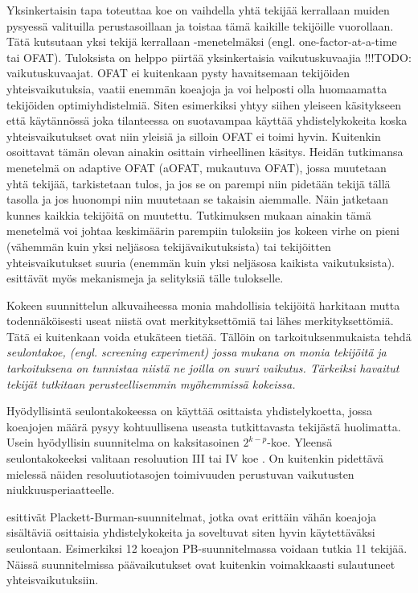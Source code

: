 \documentclass[12pt,a4paper,finnish]{tutthesis}
\newcommand\todo[1]{{\color{red}!!!TODO: #1}} %
\begin{document}
Yksinkertaisin tapa toteuttaa koe on vaihdella yhtä tekijää kerrallaan
muiden pysyessä valituilla perustasoillaan ja toistaa
tämä kaikille tekijöille vuorollaan. Tätä kutsutaan
yksi tekijä kerrallaan -menetelmäksi
(engl. one-factor-at-a-time tai OFAT).
Tuloksista on helppo piirtää yksinkertaisia vaikutuskuvaajia
\todo{vaikutuskuvaajat}.
OFAT ei kuitenkaan pysty havaitsemaan
tekijöiden yhteisvaikutuksia,
vaatii enemmän koeajoja
ja voi helposti olla huomaamatta tekijöiden optimiyhdistelmiä.
Siten esimerkiksi \textcite{Montgomery2012}
yhtyy siihen yleiseen käsitykseen että käytännössä joka tilanteessa on
suotavampaa käyttää yhdistelykokeita koska yhteisvaikutukset
ovat niin yleisiä ja silloin OFAT ei toimi hyvin.
Kuitenkin \textcite{frey2005mechanisms} osoittavat tämän
olevan ainakin osittain virheellinen käsitys. Heidän tutkimansa
menetelmä on adaptive OFAT (aOFAT, mukautuva OFAT), jossa muutetaan
yhtä tekijää, tarkistetaan tulos, ja jos se on parempi niin
pidetään tekijä tällä tasolla ja jos huonompi niin muutetaan se
takaisin aiemmalle. Näin jatketaan kunnes kaikkia tekijöitä on
muutettu. Tutkimuksen mukaan ainakin tämä menetelmä voi
johtaa keskimäärin parempiin tuloksiin jos kokeen virhe on
pieni (vähemmän kuin yksi neljäsosa tekijävaikutuksista) tai
tekijöitten yhteisvaikutukset suuria (enemmän kuin yksi neljäsosa
kaikista vaikutuksista). \textcite{frey2005mechanisms} esittävät
myös mekanismeja ja selityksiä tälle tulokselle.


Kokeen suunnittelun alkuvaiheessa monia mahdollisia tekijöitä harkitaan
mutta todennäköisesti useat niistä ovat merkityksettömiä tai lähes
merkityksettömiä. Tätä ei kuitenkaan voida etukäteen tietää. Tällöin
on tarkoituksenmukaista tehdä \em seulontakoe, \em
(engl. screening experiment) jossa mukana on monia tekijöitä
ja tarkoituksena on tunnistaa niistä ne joilla on suuri vaikutus.
Tärkeiksi havaitut tekijät tutkitaan perusteellisemmin myöhemmissä
kokeissa.

Hyödyllisintä seulontakokeessa on käyttää osittaista
yhdistelykoetta, jossa koeajojen määrä pysyy kohtuullisena
useasta tutkittavasta tekijästä huolimatta.
Usein hyödyllisin suunnitelma on kaksitasoinen \(2^{k - p}\)-koe.
Yleensä seulontakokeeksi valitaan
resoluution III tai IV koe \parencite[s.~9]{montgomery2006}.
On kuitenkin pidettävä mielessä näiden resoluutiotasojen
toimivuuden perustuvan vaikutusten niukkuusperiaatteelle.

\textcite{plackett1946} esittivät Plackett-Burman-suunnitelmat,
jotka ovat erittäin vähän koeajoja sisältäviä osittaisia yhdistelykokeita
ja soveltuvat siten hyvin käytettäväksi seulontaan. Esimerkiksi 12 koeajon
PB-suunnitelmassa voidaan tutkia 11 tekijää. Näissä suunnitelmissa
päävaikutukset ovat kuitenkin voimakkaasti sulautuneet yhteisvaikutuksiin.
\end{document}
